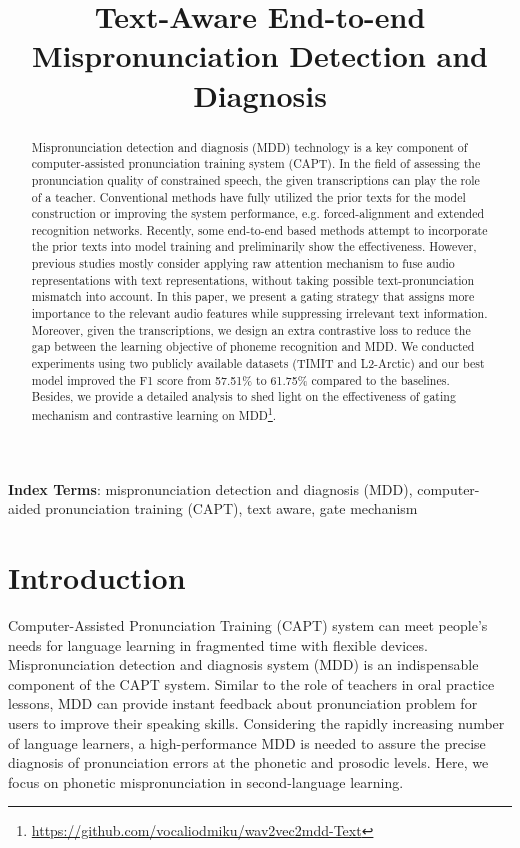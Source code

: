 \documentclass[a4paper]{article}
\title{Text-Aware End-to-end Mispronunciation Detection and Diagnosis}
\begin{document}
\maketitle
% 
\begin{abstract}
Mispronunciation detection and diagnosis (MDD) technology is a key component of computer-assisted pronunciation training system (CAPT). In the field of assessing the pronunciation quality of constrained speech, the given transcriptions can play the role of a teacher. Conventional methods have fully utilized the prior texts for the model construction or improving the system performance, e.g. forced-alignment and extended recognition networks. Recently, some end-to-end based methods attempt to incorporate the prior texts into model training and preliminarily show the effectiveness. However, previous studies mostly consider applying raw attention mechanism to fuse audio representations with text representations, without taking possible text-pronunciation mismatch into account. In this paper, we present a gating strategy that assigns more importance to the relevant audio features while suppressing irrelevant text information. Moreover, given the transcriptions, we design an extra contrastive loss to reduce the gap between the learning objective of phoneme recognition and MDD. We conducted experiments using two publicly available datasets (TIMIT and L2-Arctic) and our best model improved the F1 score from 57.51\% to 61.75\% compared to the baselines. Besides, we provide a detailed analysis to shed light on the effectiveness of gating mechanism and contrastive learning on MDD\footnote{\url{https://github.com/vocaliodmiku/wav2vec2mdd-Text}}.
\end{abstract}
\noindent\textbf{Index Terms}: mispronunciation detection and diagnosis (MDD), computer-aided pronunciation training (CAPT), text aware, gate mechanism

\section{Introduction}
Computer-Assisted Pronunciation Training (CAPT) system can meet people's needs for language learning in fragmented time with flexible devices. Mispronunciation detection and diagnosis system (MDD) is an indispensable component of the CAPT system. Similar to the role of teachers in oral practice lessons, MDD can provide instant feedback about pronunciation problem for users to improve their speaking skills. Considering the rapidly increasing number of language learners, a high-performance MDD is needed to assure the precise diagnosis of pronunciation errors at the phonetic and prosodic levels. Here, we focus on phonetic mispronunciation in second-language learning.
\end{document}
